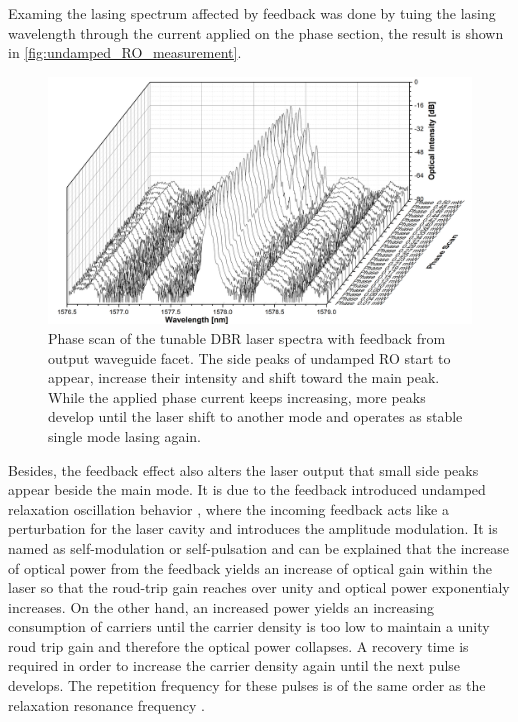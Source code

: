 Examing the lasing spectrum affected by feedback was done by tuing the lasing wavelength through the current applied on the phase section, the result is shown in \autoref{fig:undamped_RO_measurement}.

\begin{figure}[ht]
    \centering
    \includegraphics[width=\linewidth]{figures/Undamped_RO_phase_scan_grating_4621.png}
    \caption{Phase scan of the tunable DBR laser spectra with feedback from output waveguide facet. The side peaks of undamped RO start to appear, increase their intensity and shift toward the main peak. While the applied phase current keeps increasing, more peaks develop until the laser shift to another mode and operates as stable single mode lasing again.}
    \label{fig:undamped_RO_phase_scan}
\end{figure}

Besides, the feedback effect also alters the laser output that small side peaks appear beside the main mode. It is due to the feedback introduced undamped relaxation oscillation behavior \cite{lenstra1985coherence, bauer2004nonlinear, soriano2013complex}, where the incoming feedback acts like a perturbation for the laser cavity and introduces the amplitude modulation. It is named as self-modulation \cite{broom1969self, broom1970microwave} or self-pulsation \cite{petermann2012laser} and can be explained that the increase of optical power from the feedback yields an increase of optical gain within the laser so that the roud-trip gain reaches over unity and optical power exponentialy increases. On the other hand, an increased power yields an increasing consumption of carriers until the carrier density is too low to maintain a unity roud trip gain and therefore the optical power collapses. A recovery time is required in order to increase the carrier density again until the next pulse develops. The repetition frequency for these pulses is of the same order as the relaxation resonance frequency \cite{petermann2012laser}.


